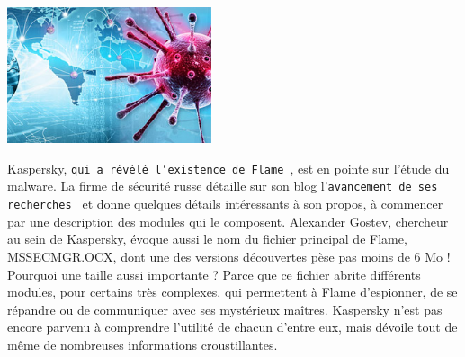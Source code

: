\documentclass[11pt,twoside,a4paper]{article}
\begin{document}
\begin{minipage}[ht]{6.25cm}	
	\includegraphics[width=6.00cm]{img/685315.jpg}
\end{minipage} \hfill \begin{minipage}[ht]{12.50cm}
	\small
	Kaspersky, \texttt{qui a r{\'e}v{\'e}l{\'e} l'existence de Flame~\footnotemark}, est en pointe sur l'{\'e}tude du malware. La firme de s{\'e}curit{\'e} russe d{\'e}taille sur son blog l'\texttt{avancement de ses recherches~\footnotemark} et donne quelques d{\'e}tails int{\'e}ressants {\`a} son propos, {\`a} commencer par une description des modules qui le composent. Alexander Gostev, chercheur au sein de Kaspersky, {\'e}voque aussi le nom du fichier principal de Flame, MSSECMGR.OCX, dont une des versions d{\'e}couvertes p{\`e}se pas moins de 6 Mo !~\\
	
	Pourquoi une taille aussi importante ? Parce que ce fichier abrite diff{\'e}rents modules, pour certains tr{\`e}s complexes, qui permettent {\`a} Flame d'espionner, de se r{\'e}pandre ou de communiquer avec ses myst{\'e}rieux ma{\^i}tres. Kaspersky n'est pas encore parvenu {\`a} comprendre l'utilit{\'e} de chacun d'entre eux, mais d{\'e}voile tout de m{\^e}me de nombreuses informations croustillantes.~\\
\end{minipage}
~
~
\end{document}
